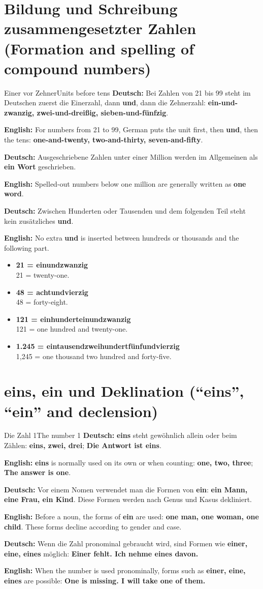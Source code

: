 \documentclass[a4paper,11pt]{article}
\newcommand{\GermanText}[1]{\textbf{Deutsch: }#1\par}
\newcommand{\EnglishText}[1]{{\small\color{SoftGray}\textbf{English: }#1\par}}
\newcommand{\ExampleItem}[2]{\item \textbf{#1}\\{\small\color{SoftGray}#2}}
\begin{document}
\section{Bildung und Schreibung zusammengesetzter Zahlen \textnormal{(Formation and spelling of compound numbers)}}
\begin{grammarentry}{Einer vor Zehner}{Units before tens}
\GermanText{Bei Zahlen von 21 bis 99 steht im Deutschen zuerst die Einerzahl, dann \textbf{und}, dann die Zehnerzahl: \textbf{ein-und-zwanzig, zwei-und-dreißig, sieben-und-fünfzig}.}
\EnglishText{For numbers from 21 to 99, German puts the unit first, then \textbf{und}, then the tens: \textbf{one-and-twenty, two-and-thirty, seven-and-fifty}.}
\GermanText{Ausgeschriebene Zahlen unter einer Million werden im Allgemeinen als \textbf{ein Wort} geschrieben.}
\EnglishText{Spelled-out numbers below one million are generally written as \textbf{one word}.}
\GermanText{Zwischen Hunderten oder Tausenden und dem folgenden Teil steht kein zusätzliches \textbf{und}.}
\EnglishText{No extra \textbf{und} is inserted between hundreds or thousands and the following part.}
\end{grammarentry}

\begin{exbox}
\begin{itemize}
\ExampleItem{21 = einundzwanzig}{21 = twenty-one.}
\ExampleItem{48 = achtundvierzig}{48 = forty-eight.}
\ExampleItem{121 = einhunderteinundzwanzig}{121 = one hundred and twenty-one.}
\ExampleItem{1.245 = eintausendzweihundertfünfundvierzig}{1,245 = one thousand two hundred and forty-five.}
\end{itemize}
\end{exbox}

\section{\glqq eins\grqq, \glqq ein\grqq{} und Deklination \textnormal{(``eins'', ``ein'' and declension)}}
\begin{grammarentry}{Die Zahl 1}{The number 1}
\GermanText{\textbf{eins} steht gewöhnlich allein oder beim Zählen: \textbf{eins, zwei, drei}; \textbf{Die Antwort ist eins}.}
\EnglishText{\textbf{eins} is normally used on its own or when counting: \textbf{one, two, three}; \textbf{The answer is one}.}
\GermanText{Vor einem Nomen verwendet man die Formen von \textbf{ein}: \textbf{ein Mann, eine Frau, ein Kind}. Diese Formen werden nach Genus und Kasus dekliniert.}
\EnglishText{Before a noun, the forms of \textbf{ein} are used: \textbf{one man, one woman, one child}. These forms decline according to gender and case.}
\GermanText{Wenn die Zahl pronominal gebraucht wird, sind Formen wie \textbf{einer, eine, eines} möglich: \textbf{Einer fehlt. Ich nehme eines davon.}}
\EnglishText{When the number is used pronominally, forms such as \textbf{einer, eine, eines} are possible: \textbf{One is missing. I will take one of them.}}
\end{grammarentry}
\end{document}
